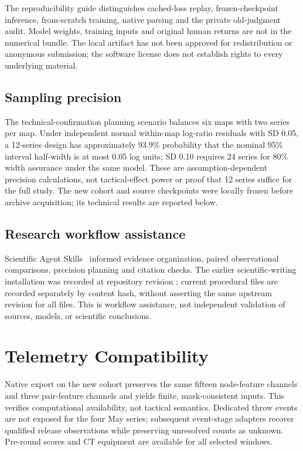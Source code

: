 The reproducibility guide distinguishes cached-loss replay, frozen-checkpoint inference, from-scratch training, native parsing and the private old-judgment audit. Model weights, training inputs and original human returns are not in the numerical bundle. The local artifact has not been approved for redistribution or anonymous submission; the software license does not establish rights to every underlying material.

\subsection{Sampling precision}
The technical-confirmation planning scenario balances six maps with two series per map. Under independent normal within-map log-ratio residuals with SD 0.05, a 12-series design has approximately 93.9\% probability that the nominal 95\% interval half-width is at most 0.05 log units; SD 0.10 requires 24 series for 80\% width assurance under the same model. These are assumption-dependent precision calculations, not tactical-effect power or proof that 12 series suffice for the full study. The new cohort and source checkpoints were locally frozen before archive acquisition; its technical results are reported below. %

\subsection{Research workflow assistance}
Scientific Agent Skills~\cite{kassis2026skills} informed evidence organization, paired observational comparisons, precision planning and citation checks. The earlier scientific-writing installation was recorded at repository revision ; current procedural files are recorded separately by content hash, without asserting the same upstream revision for all files. This is workflow assistance, not independent validation of sources, models, or scientific conclusions. %

\section{Telemetry Compatibility}
\label{app:telemetry}
Native export on the new cohort preserves the same fifteen node-feature channels and three pair-feature channels and yields finite, mask-consistent inputs. This verifies computational availability, not tactical semantics. Dedicated throw events are not exposed for the four May series; subsequent event-stage adapters recover qualified release observations while preserving unresolved counts as unknown. Pre-round scores and CT equipment are available for all selected windows. %

